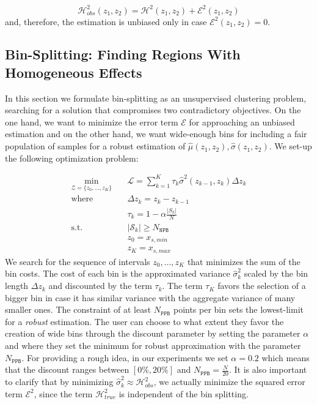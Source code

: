 \documentclass[twoside]{article}
\begin{document}
\begin{equation}
  \label{eq:uncertainty-bin}
  \mathcal{H}^2_{obs}(z_1, z_2) = \mathcal{H}^2(z_1, z_2) + \mathcal{E}^2(z_1, z_2)
\end{equation}
%
and, therefore, the estimation is unbiased only in case
\(\mathcal{E}^2(z_1, z_2) = 0\).

\subsection{Bin-Splitting: Finding Regions With Homogeneous Effects}
\label{sec:bin-spliting}

In this section we formulate bin-splitting as an unsupervised
clustering problem, searching for a solution that compromises two
contradictory objectives. On the one hand, we want to minimize the
error term \(\mathcal{E}\) for approaching an unbiased estimation and
on the other hand, we want wide-enough bins for including a fair
population of samples for a robust estimation of
\(\hat{\mu}(z_1, z_2), \hat{\sigma}(z_1, z_2)\). We set-up the
following optimization problem:

\begin{equation}
  \label{eq:opt}
\begin{aligned}
  \min_{ \mathcal{Z} = \{z_0, \ldots, z_K\}} \quad & \mathcal{L} = \sum_{k=1}^K \tau_k \hat{\sigma}^2(z_{k-1}, z_k) \Delta z_k \\
  \textrm{where} \quad & \Delta z_k = z_k - z_{k-1} \\
  & \tau_k = 1 - \alpha \frac{|S_k|}{N} \\
  \textrm{s.t.} \quad & |\mathcal{S}_k| \geq N_{\mathtt{NPB}}\\
                                     & z_0 = x_{s,min}\\
                                     & z_K = x_{s, max}
\end{aligned}
\end{equation}
%
We search for the sequence of intervals \(z_0, \ldots, z_K\) that
minimizes the sum of the bin costs. The cost of each bin is the
approximated variance \(\hat{\sigma}^2_k\) scaled by the bin length
\(\Delta z_k\) and discounted by the term \(\tau_k\). The term
\(\tau_K\) favors the selection of a bigger bin in case it has similar
variance with the aggregate variance of many smaller ones. The
constraint of at least \(N_{\mathtt{PPB}}\) points per bin sets the
lowest-limit for a \textit{robust} estimation. The user can choose to
what extent they favor the creation of wide bins through the discount
parameter by setting the parameter \(\alpha\) and where they set the
minimum for robust approximation with the parameter
\(N_{\mathtt{PPB}}\). For providing a rough idea, in our experiments
we set \(\alpha = 0.2\) which means that the discount ranges between
\([0\%, 20\%]\) and \(N_{\mathtt{PPB}} = \frac{N}{20}\). It is also
important to clarify that by minimizing
\(\hat{\sigma}^2_k \approx \mathcal{H}_{obs}^2\), we actually minimize
the squared error term \(\mathcal{E}^2\), since the term
\(\mathcal{H}^2_{true}\) is independent of the bin splitting.
\end{document}
